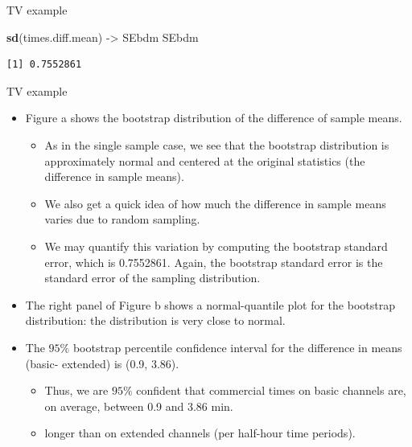 \documentclass[
  ignorenonframetext,
]{beamer}
\newenvironment{Shaded}{\begin{snugshade}}{\end{snugshade}}
\newcommand{\FunctionTok}[1]{\textcolor[rgb]{0.13,0.29,0.53}{\textbf{#1}}}
\newcommand{\NormalTok}[1]{#1}
\newcommand{\OtherTok}[1]{\textcolor[rgb]{0.56,0.35,0.01}{#1}}
\providecommand{\tightlist}{%
  \setlength{\itemsep}{0pt}\setlength{\parskip}{0pt}}
\begin{document}
\begin{frame}[fragile]{TV example}
\begin{Shaded}
\begin{Highlighting}[]
\FunctionTok{sd}\NormalTok{(times.diff.mean) }\OtherTok{{-}\textgreater{}}\NormalTok{ SEbdm}
\NormalTok{SEbdm}
\end{Highlighting}
\end{Shaded}

\begin{verbatim}
[1] 0.7552861
\end{verbatim}

\normalsize
\end{frame}

\begin{frame}{TV example}
\protect\hypertarget{tv-example-5}{}
\begin{itemize}
\item
  Figure a shows the bootstrap distribution of the difference of sample
  means.

  \begin{itemize}
  \tightlist
  \item
    As in the single sample case, we see that the bootstrap distribution
    is approximately normal and centered at the original statistics (the
    difference in sample means).
  \item
    We also get a quick idea of how much the difference in sample means
    varies due to random sampling.
  \item
    We may quantify this variation by computing the bootstrap standard
    error, which is 0.7552861. Again, the bootstrap standard error is
    the standard error of the sampling distribution.
  \end{itemize}
\item
  The right panel of Figure b shows a normal-quantile plot for the
  bootstrap distribution: the distribution is very close to normal.
\item
  The \(95\%\) bootstrap percentile confidence interval for the
  difference in means (basic- extended) is (0.9, 3.86).

  \begin{itemize}
  \tightlist
  \item
    Thus, we are \(95\%\) confident that commercial times on basic
    channels are, on average, between 0.9 and 3.86 min.
  \item
    longer than on extended channels (per half-hour time periods).
  \end{itemize}
\end{itemize}
\end{frame}
\end{document}
